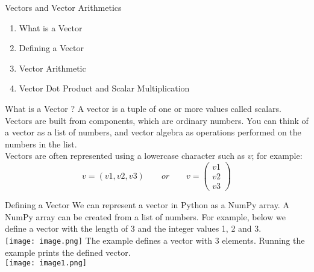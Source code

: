 \documentclass{beamer}
\begin{document}
\begin{frame}{Vectors and Vector Arithmetics}
\begin{flushleft}
	\begin{enumerate}
		\item What is a Vector
		\item Defining a Vector
		\item Vector Arithmetic
		\item Vector Dot Product and Scalar Multiplication
	\end{enumerate}
\end{flushleft}
\begin{block}{What is a Vector ?}
A vector is a tuple of one or more values called scalars. Vectors are built from components, which are ordinary numbers. You can think of a vector as a list of numbers, and vector algebra as operations performed on the numbers in the list. \\
\vspace{5pt}
Vectors are often represented using a lowercase character such as $v$; for example:
\begin{equation*}
	v = (v1, v2, v3) 
	\qquad or \qquad 
	v = \begin{pmatrix}
    		v1 \\
    		v2 \\
    		v3
  		\end{pmatrix}
\end{equation*}
\end{block}
\end{frame}
\begin{frame}
\begin{block}{Defining a Vector}
	We can represent a vector in Python as a NumPy array. A NumPy array can be created from a list of numbers. For example, below we define a vector with the length of 3 and the integer values 1, 2 and 3.\\
	\vspace{10pt}
	\texttt{[image: image.png]}
	The example defines a vector with 3 elements. Running the example prints the  defined vector. \\
	\vspace{10pt}
	\texttt{[image: image1.png]}
\end{block}
\end{frame}
\end{document}
